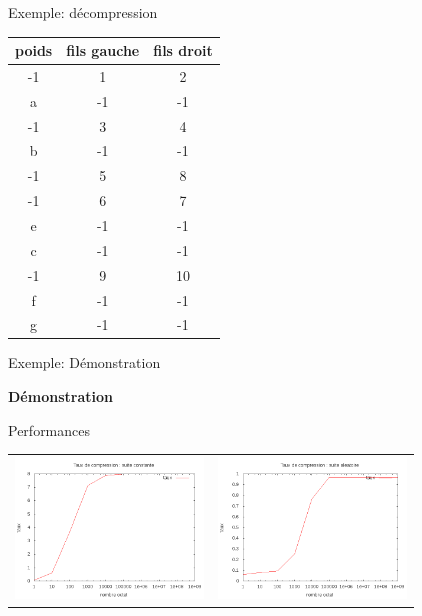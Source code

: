 \documentclass[french]{beamer}
\begin{document}
\begin{frame}{Exemple: décompression}
		
	\begin{tabular}{|c|c|c|}
	\hline
	poids & fils gauche & fils droit \\
	\hline -1 & 1 & 2 \\
	\hline a & -1 & -1\\
	\hline -1 & 3 & 4 \\
	\hline b & -1 & -1 \\
	\hline -1 & 5 & 8 \\
	\hline -1 & 6 & 7 \\
	\hline e & -1 & -1 \\
	\hline c & -1 & -1 \\
	\hline -1 & 9 & 10 \\
	\hline f & -1 & -1\\
	\hline g & -1 & -1\\
	\hline
	\end{tabular}
\end{frame}
\begin{frame}{Exemple: Démonstration}
	\begin{center}
	\textbf{Démonstration}
	\end{center}
\end{frame}

\begin{frame}{Performances}
	\begin{center}
	\begin{tabular}{l | l}
	\includegraphics[width=5cm]{HConstant.png} & 
	\includegraphics[width=5cm]{aleaH.png}
	\end{tabular}
	\end{center}
\end{frame}
\end{document}
